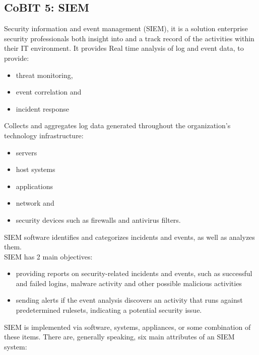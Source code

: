 \documentclass[8pt]{extarticle}
\begin{document}
\begin{multicols}{3}
\subsection{CoBIT 5: SIEM}
Security information and event management (SIEM), it is a solution enterprise security professionals both insight into
and a track record of the activities within their IT environment. It provides Real time analysis of log and event data,
to provide: 
\begin{itemize}
    \item threat monitoring,
    \item event correlation and
    \item incident response
\end{itemize}
\noindent
Collects and aggregates log data generated throughout the
organization’s technology infrastructure:
\begin{itemize}
    \item servers
    \item host systems
    \item applications
    \item network and
    \item security devices such as firewalls and antivirus filters.
\end{itemize}
\noindent
SIEM software identifies and categorizes incidents and events, as well as analyzes them. \\
SIEM has 2 main objectives:
\begin{itemize}
    \item providing reports on security-related incidents and events,
    such as successful and failed logins, malware activity and
    other possible malicious activities
    \item sending alerts if the event analysis discovers an activity that
    runs against predetermined rulesets, indicating a potential
    security issue.
\end{itemize}
\noindent
SIEM is implemented via software, systems, appliances, or some combination of these items. 
There are, generally speaking, six main attributes of an SIEM system:


\end{multicols}
\end{document}
